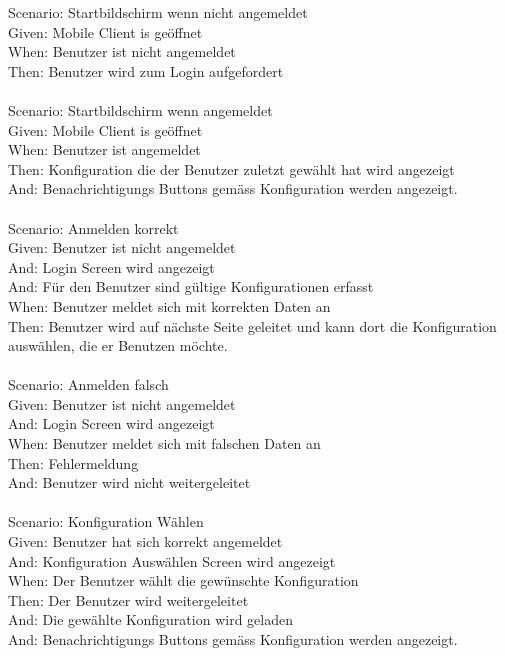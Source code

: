         Scenario: Startbildschirm wenn nicht angemeldet\\
        Given:  Mobile Client is geöffnet\\
        When: Benutzer ist nicht angemeldet\\
        Then: Benutzer wird zum Login aufgefordert\\
        \\
        Scenario: Startbildschirm wenn angemeldet\\
        Given:  Mobile Client is geöffnet\\
        When: Benutzer ist angemeldet\\
        Then: Konfiguration die der Benutzer zuletzt gewählt hat wird angezeigt\\
        And:   Benachrichtigungs Buttons gemäss Konfiguration werden angezeigt.\\
        \\
        Scenario: Anmelden korrekt\\
        Given: Benutzer ist nicht angemeldet\\
        And:   Login Screen wird angezeigt\\
        And:    Für den Benutzer sind gültige Konfigurationen erfasst\\
        When:  Benutzer meldet sich mit korrekten Daten an\\
        Then:  Benutzer wird auf nächste Seite geleitet und kann dort die Konfiguration auswählen, die er Benutzen möchte.\\
        \\
        Scenario: Anmelden falsch\\
        Given: Benutzer ist nicht angemeldet\\
        And:   Login Screen wird angezeigt\\
        When:  Benutzer meldet sich mit falschen Daten an\\
        Then:  Fehlermeldung\\
        And: Benutzer wird nicht weitergeleitet\\
        \\
        Scenario: Konfiguration Wählen\\
        Given: Benutzer hat sich korrekt angemeldet\\
        And:   Konfiguration Auswählen Screen wird angezeigt\\
        When:  Der Benutzer wählt die gewünschte Konfiguration\\
        Then:  Der Benutzer wird weitergeleitet\\
        And:   Die gewählte Konfiguration wird geladen\\
        And:   Benachrichtigungs Buttons gemäss Konfiguration werden angezeigt.\\


